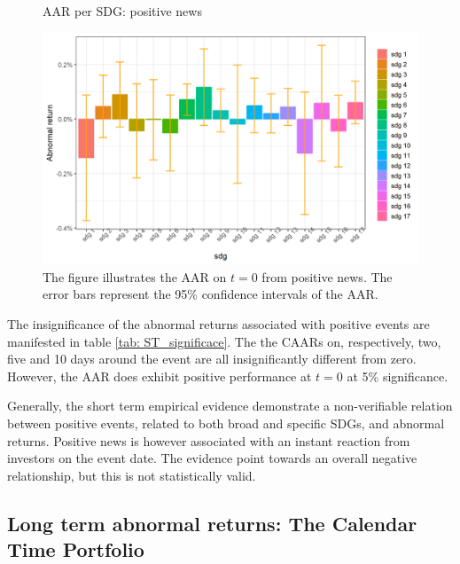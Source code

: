 \begin{figure} [H]
    \centering
    \caption{AAR per SDG: positive news}
    \includegraphics[scale=0.6]{Projekt/1.Figures analysis/ST_positive_sdg_bar.png}
    \caption*{\footnotesize The figure illustrates the AAR on $t = 0$ from positive news. The error bars represent the 95\% confidence intervals of the AAR.}
    \label{fig:ST_pos_bar}
\end{figure}

The insignificance of the abnormal returns associated with positive events are manifested in table \ref{tab: ST_significace}. The the CAARs on, respectively, two, five and 10 days around the event are all insignificantly different from zero. However, the AAR does exhibit positive performance at $t = 0$ at 5\% significance.  

Generally, the short term empirical evidence demonstrate a non-verifiable relation between positive events, related to both broad and specific SDGs, and abnormal returns. Positive news is however associated with an instant reaction from investors on the event date. The evidence point towards an overall negative relationship, but this is not statistically valid.  



\subsection{Long term abnormal returns: The Calendar Time Portfolio} \label{sec: long_term_portfolio}

